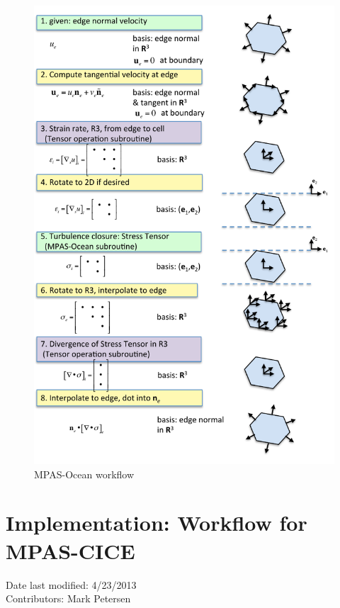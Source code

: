 \documentclass[11pt]{report}
\begin{document}
\begin{figure}[htbp]
 \center
 \includegraphics[scale=0.9]{f/mpaso_tensor_workflow.pdf}
 \caption{MPAS-Ocean workflow}
 \label{fig:mpaso_tensor_workflow}
\end{figure}


\newpage

\section{Implementation: Workflow for MPAS-CICE}
Date last modified: 4/23/2013 \\
Contributors: Mark Petersen \\
\end{document}
